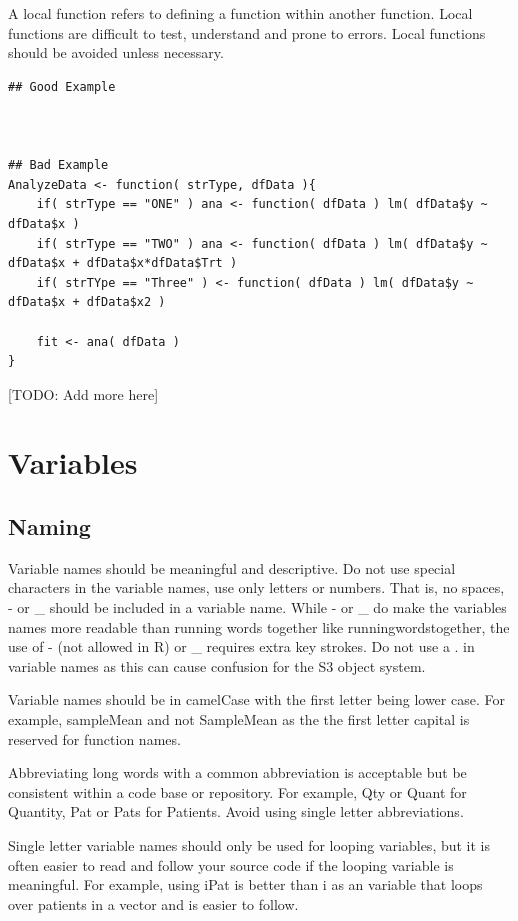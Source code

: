 \documentclass[
]{book}
\begin{document}
A local function refers to defining a function within another function. Local functions are difficult to test, understand and prone to errors. Local functions should be avoided unless necessary.

\begin{verbatim}
## Good Example 



## Bad Example
AnalyzeData <- function( strType, dfData ){
    if( strType == "ONE" ) ana <- function( dfData ) lm( dfData$y ~ dfData$x )
    if( strType == "TWO" ) ana <- function( dfData ) lm( dfData$y ~ dfData$x + dfData$x*dfData$Trt )
    if( strTYpe == "Three" ) <- function( dfData ) lm( dfData$y ~ dfData$x + dfData$x2 )
    
    fit <- ana( dfData )
}
\end{verbatim}

{[}TODO: Add more here{]}

\hypertarget{variables}{%
\chapter{Variables}\label{variables}}

\hypertarget{naming-1}{%
\section{Naming}\label{naming-1}}

Variable names should be meaningful and descriptive. Do not use special characters in the variable names, use only letters or numbers. That is, no spaces, - or \_ should be included in a variable name. While - or \_ do make the variables names more readable than running words together like runningwordstogether, the use of - (not allowed in R) or \_ requires extra key strokes. Do not use a . in variable names as this can cause confusion for the S3 object system.

Variable names should be in camelCase with the first letter being lower case. For example, sampleMean and not SampleMean as the the first letter capital is reserved for function names.

Abbreviating long words with a common abbreviation is acceptable but be consistent within a code base or repository. For example, Qty or Quant for Quantity, Pat or Pats for Patients. Avoid using single letter abbreviations.

Single letter variable names should only be used for looping variables, but it is often easier to read and follow your source code if the looping variable is meaningful. For example, using iPat is better than i as an variable that loops over patients in a vector and is easier to follow.
\end{document}
